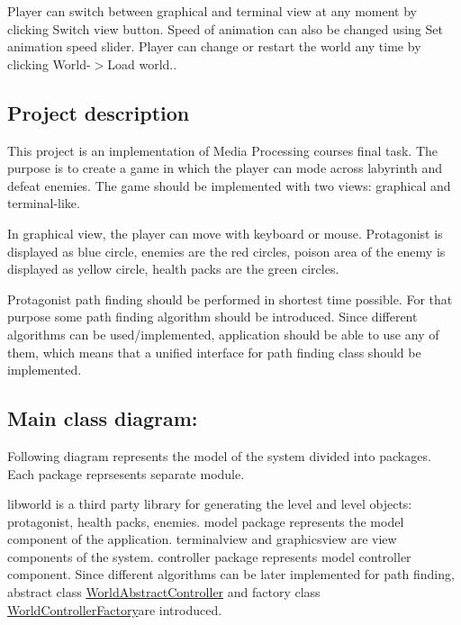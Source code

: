 Player can switch between graphical and terminal view at any moment by clicking {\ttfamily Switch view} button. Speed of animation can also be changed using {\ttfamily Set animation speed} slider. Player can change or restart the world any time by clicking {\ttfamily World-\/$>$Load world..}

\subsection*{Project description}

This project is an implementation of Media Processing course\textquotesingle{}s final task. The purpose is to create a game in which the player can mode across labyrinth and defeat enemies. The game should be implemented with two views\+: graphical and terminal-\/like.

In graphical view, the player can move with keyboard or mouse. Protagonist is displayed as blue circle, enemies are the red circles, poison area of the enemy is displayed as yellow circle, health packs are the green circles.

Protagonist path finding should be performed in shortest time possible. For that purpose some path finding algorithm should be introduced. Since different algorithms can be used/implemented, application should be able to use any of them, which means that a unified interface for path finding class should be implemented.

\subsection*{Main class diagram\+:}

Following diagram represents the model of the system divided into packages. Each package reprsesents separate module.



{\ttfamily libworld} is a third party library for generating the level and level objects\+: protagonist, health packs, enemies. {\ttfamily model} package represents the model component of the application. {\ttfamily terminalview} and {\ttfamily graphicsview} are view components of the system. {\ttfamily controller} package represents model controller component. Since different algorithms can be later implemented for path finding, abstract class {\ttfamily \hyperlink{classWorldAbstractController}{World\+Abstract\+Controller}} and factory class {\ttfamily \hyperlink{classWorldControllerFactory}{World\+Controller\+Factory}}are introduced.

